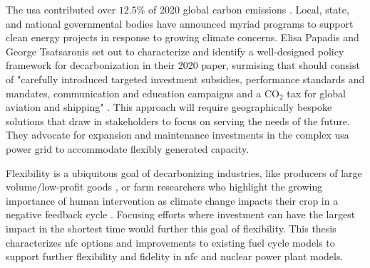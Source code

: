 The \gls{usa} contributed over $12.5\%$ of 2020 global carbon emissions \cite{european_commission_joint_research_centre_ghg_2021}. Local, state, and national governmental bodies have announced myriad programs to support clean energy projects in response to growing climate concerns. Elisa Papadis and George Tsatsaronis set out to characterize and identify a well-designed policy framework for decarbonization in their 2020 paper, surmising that should consist of "carefully introduced targeted investment subsidies, performance standards and mandates, communication and education campaigns and a CO$_2$ tax for global aviation and shipping" \cite{papadis_challenges_2020}. This approach will require geographically bespoke solutions that draw in stakeholders to focus on serving the needs of the future. They advocate for expansion and maintenance investments in the complex \gls{usa} power grid to accommodate flexibly generated capacity.


Flexibility is a ubiquitous goal of decarbonizing industries, like producers of large volume/low-profit goods \cite{mallapragada_decarbonization_2023}, or farm researchers who highlight the growing importance of human intervention as climate change impacts their crop in a negative feedback cycle \cite{farokhi_soofi_farm_2022}. Focusing efforts where investment can have the largest impact in the shortest time would further this goal of flexibility. This thesis characterizes \gls{nfc} options and improvements to existing fuel cycle models to support further flexibility and fidelity in \gls{nfc} and nuclear power plant models.



